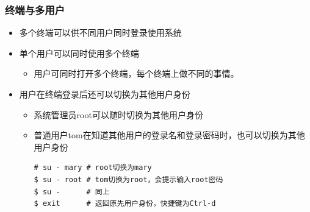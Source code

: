 \documentclass[xcolor=svgnames,bigger,presentation]{beamer}
\begin{document}
\begin{frame}[fragile]
\frametitle{终端与多用户}
\label{sec-4-1-2}
\begin{itemize}

\item 多个终端可以供不同用户同时登录使用系统
\label{sec-4-1-2-1}%

\item 单个用户可以同时使用多个终端
\label{sec-4-1-2-2}%
\begin{itemize}

\item 用户可同时打开多个终端，每个终端上做不同的事情。
\label{sec-4-1-2-2-1}%
\end{itemize} %

\item 用户在终端登录后还可以切换为其他用户身份
\label{sec-4-1-2-3}%
\begin{itemize}

\item 系统管理员root可以随时切换为其他用户身份
\label{sec-4-1-2-3-1}%

\item 普通用户tom在知道其他用户的登录名和登录密码时，也可以切换为其他用户身份\\
\label{sec-4-1-2-3-2}%
\begin{verbatim}
# su - mary # root切换为mary
$ su - root # tom切换为root，会提示输入root密码
$ su -      # 同上
$ exit      # 返回原先用户身份，快捷键为Ctrl-d
\end{verbatim}
\end{itemize} %
\end{itemize} %
\end{frame}
\end{document}
